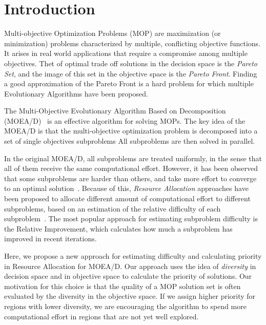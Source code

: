 \section{Introduction}

Multi-objective Optimization Problems (MOP) are maximization (or minimization)
problems characterized by multiple, conflicting objective functions. It arises
in real world applications that require a compromise among multiple objectives.
Thet of optimal trade off solutions in the decision space is the \emph{Pareto
Set}, and the image of this set in the objective space is the \emph{Pareto
Front}. Finding a good approximation of the Pareto Front is a hard problem for
which multiple Evolutionary Algorithms have been proposed.

The Multi-Objective Evolutionary Algorithm Based on Decomposition
(MOEA/D)~\cite{zhang2007moea} is an effective algorithm for solving MOPs. The
key idea of the MOEA/D is that the multi-objective optimization problem is
decomposed into a set of single objectives subproblems All subproblems
are then solved in parallel.

In the original MOEA/D, all subproblems are treated uniformly, in the sense that
all of them receive the same computational effort. However, it has been observed
that some subproblems are harder than others, and take more effort to converge
to an optimal solution~\cite{zhou2016all}. Because of this, \emph{Resource
Allocation} approaches have been proposed to allocate different amount of
computational effort to different subproblems, based on an estimation of the
relative difficulty of each subproblem~\cite{zhou2016all, zhang2009performance,
kang2018collaborative}. The most popular approach for estimating subproblem
difficulty is the Relative Improvement, which calculates how much a subproblem
has improved in recent iterations.

Here, we propose a new approach for estimating difficulty and
calculating priority in Resource Allocation for MOEA/D. Our approach uses the
idea of \emph{diversity} in decision space and in objective space to calculate
the priority of solutions. Our motivation for this choice is that the quality of
a MOP solution set is often evaluated by the diversity in the objective space.
If we assign higher priority for regions with lower diversity, we are
encouraging the algorithm to spend more computational effort in regions that are
not yet well explored.


